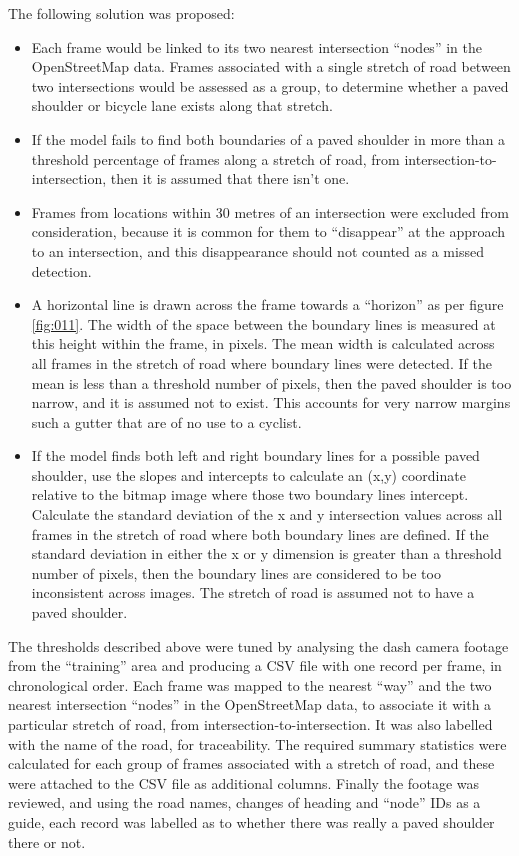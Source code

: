 \documentclass[11pt,twoside]{report}
\begin{document}
The following solution was proposed:

\begin{itemize}
\item{Each frame would be linked to its two nearest intersection ``nodes'' in the OpenStreetMap data.  Frames associated with a single stretch of road between two intersections would be assessed as a group, to determine whether a paved shoulder or bicycle lane exists along that stretch.}
\item{If the model fails to find both boundaries of a paved shoulder in more than a threshold percentage of frames along a stretch of road, from intersection-to-intersection, then it is assumed that there isn't one.}
\item{Frames from locations within 30 metres of an intersection were excluded from consideration, because it is common for them to ``disappear'' at the approach to an intersection, and this disappearance should not counted as a missed detection.}
\item{A horizontal line is drawn across the frame towards a ``horizon'' as per figure \ref{fig:011}.  The width of the space between the boundary lines is measured at this height within the frame, in pixels.  The mean width is calculated across all frames in the stretch of road where boundary lines were detected.  If the mean is less than a threshold number of pixels, then the paved shoulder is too narrow, and it is assumed not to exist.  This accounts for very narrow margins such a gutter that are of no use to a cyclist.}
\item{If the model finds both left and right boundary lines for a possible paved shoulder, use the slopes and intercepts to calculate an (x,y) coordinate relative to the bitmap image where those two boundary lines intercept.  Calculate the standard deviation of the x and y intersection values across all frames in the stretch of road where both boundary lines are defined.  If the standard deviation in either the x or y dimension is greater than a threshold number of pixels, then the boundary lines are considered to be too inconsistent across images.  The stretch of road is assumed not to have a paved shoulder.}
\end{itemize}

The thresholds described above were tuned by analysing the dash camera footage from the ``training'' area and producing a CSV file with one record per frame, in chronological order.  Each frame was mapped to the nearest ``way'' and the two nearest intersection ``nodes'' in the OpenStreetMap data, to associate it with a particular stretch of road, from intersection-to-intersection.  It was also labelled with the name of the road, for traceability.  The required summary statistics were calculated for each group of frames associated with a stretch of road, and these were attached to the CSV file as additional columns.  Finally the footage was reviewed, and using the road names, changes of heading and ``node'' IDs as a guide, each record was labelled as to whether there was really a paved shoulder there or not.
\end{document}
